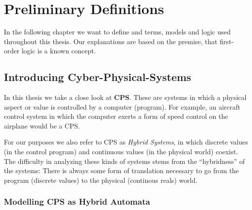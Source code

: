 

\chapter{Preliminary Definitions}
\label{ch:Preliminary}

In the following chapter we want to define and terms, models and logic used throughout this thesis. Our explanations are based on the premise, that first-order logic is a known concept.

\section{Introducing Cyber-Physical-Systems}
\label{sec:pre:cps}

In this thesis we take a close look at \textbf{CPS}. These are systems in which a physical aspect or value is controlled by a computer (program). For example, an aircraft control system in which the computer exerts a form of speed control on the airplane would be a CPS. 

For our purposes we also refer to CPS as \textit{Hybrid Systems}, in which discrete values (in the control program) and continuous values (in the physical world) coexist. The difficulty in analyzing these kinds of systems stems from the ``hybridness'' of the systems: There is always some form of translation necessary to go from the program (discrete values) to the physical (continous reals) world. 

\subsection{Modelling CPS as Hybrid Automata}

